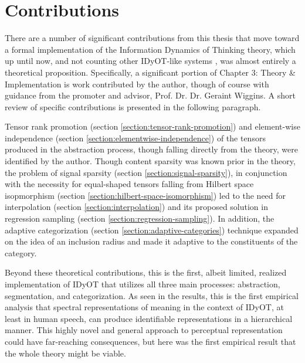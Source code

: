 \section{Contributions}
\label{section:contributions}

There are a number of significant contributions from this thesis that move toward a formal implementation of the Information Dynamics of Thinking theory, which up until now, and not counting other IDyOT-like systems \citep{forth2016entraining}, was almost entirely a theoretical proposition.  Specifically, a significant portion of Chapter 3: Theory \& Implementation is work contributed by the author, though of course with guidance from the promoter and advisor, Prof. Dr. Dr. Geraint Wiggins.  A short review of specific contributions is presented in the following paragraph.  

Tensor rank promotion (section \ref{section:tensor-rank-promotion}) and element-wise independence (section \ref{section:elementwise-independence}) of the tensors produced in the abstraction process, though falling directly from the theory, were identified by the author. Though content sparsity was known prior in the theory, the problem of signal sparsity (section \ref{section:signal-sparsity}), in conjunction with the necessity for equal-shaped tensors falling from Hilbert space isopmorphism (section \ref{section:hilbert-space-isomorphism}) led to the need for interpolation (section \ref{section:interpolation}) and its proposed solution in regression sampling (section \ref{section:regression-sampling}).  In addition, the adaptive categorization (section \ref{section:adaptive-categories}) technique expanded on the idea of an inclusion radius and made it adaptive to the constituents of the category.

Beyond these theoretical contributions, this is the first, albeit limited, realized implementation of IDyOT that utilizes all three main processes: abstraction, segmentation, and categorization. As seen in the results, this is the first empirical analysis that spectral representations of meaning in the context of IDyOT, at least in human speech, can produce identifiable representations in a hierarchical manner.  This highly novel and general approach to perceptual representation could have far-reaching consequences, but here was the first empirical result that the whole theory might be viable.

